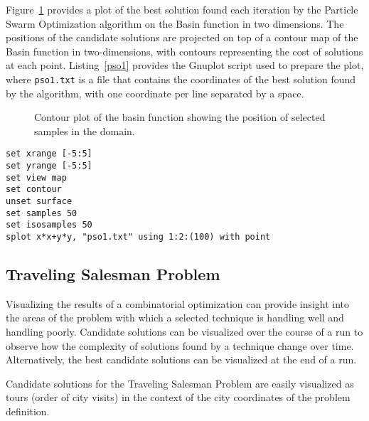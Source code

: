 \documentclass[a4paper, 11pt]{article}
\begin{document}
Figure~\ref{plot:pso1} provides a plot of the best solution found each iteration by the Particle Swarm Optimization algorithm on the Basin function in two dimensions. The positions of the candidate solutions are projected on top of a contour map of the Basin function in two-dimensions, with contours representing the cost of solutions at each point. Listing~\ref{pso1} provides the Gnuplot script used to prepare the plot, where \texttt{pso1.txt} is a file that contains the coordinates of the best solution found by the algorithm, with one coordinate per line separated by a space.

\begin{figure}[htp]

\caption{Contour plot of the basin function showing the position of selected samples in the domain.}
\label{plot:pso1}
\end{figure}



\begin{lstlisting}[caption=Gnuplot script use to create a contour plot and the position of selected samples from the domain., label=pso1]
set xrange [-5:5]
set yrange [-5:5]
set view map
set contour
unset surface
set samples 50
set isosamples 50
splot x*x+y*y, "pso1.txt" using 1:2:(100) with point
\end{lstlisting}

\subsection{Traveling Salesman Problem}
Visualizing the results of a combinatorial optimization can provide insight into the areas of the problem with which a selected technique is handling well and handling poorly.
Candidate solutions can be visualized over the course of a run to observe how the complexity of solutions found by a technique change over time. Alternatively, the best candidate solutions can be visualized at the end of a run. 

Candidate solutions for the Traveling Salesman Problem are easily visualized as tours (order of city visits) in the context of the city coordinates of the problem definition.
\end{document}
